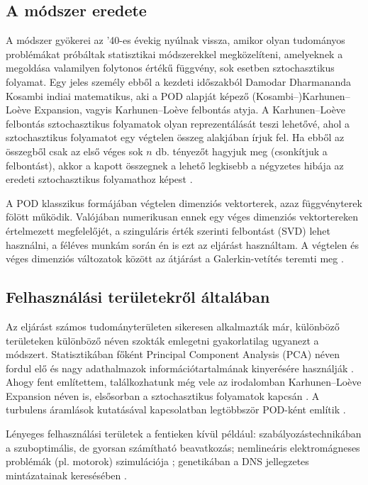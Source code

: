         \subsection{A módszer eredete}
            A módszer gyökerei az '40-es évekig nyúlnak vissza, amikor olyan tudományos problémákat próbáltak statisztikai módszerekkel megközelíteni, amelyeknek a megoldása valamilyen folytonos értékű függvény, sok esetben sztochasztikus folyamat. Egy jeles személy ebből a kezdeti időszakból Damodar Dharmananda Kosambi \cite{Kosambi11} indiai matematikus, aki a POD alapját képező (Kosambi--)Karhunen–Lo\`eve Expansion, vagyis Karhunen–Lo\`eve felbontás atyja. A Karhunen–Lo\`eve felbontás sztochasztikus folyamatok olyan reprezentálását teszi lehetővé, ahol a sztochasztikus folyamatot egy végtelen összeg alakjában írjuk fel. Ha ebből az összegből csak az első véges sok $n$ db. tényezőt hagyjuk meg (csonkítjuk a felbontást), akkor a kapott összegnek a lehető legkisebb a négyzetes hibája az eredeti sztochasztikus folyamathoz képest \cite{Aadithya18}.
            \par
            A POD klasszikus formájában végtelen dimenziós vektorterek, azaz függvényterek fölött működik. Valójában numerikusan ennek egy véges dimenziós vektortereken értelmezett megfelelőjét, a szinguláris érték szerinti felbontást (SVD) lehet használni, a féléves munkám során én is ezt az eljárást használtam. A végtelen és véges dimenziós változatok között az átjárást a Galerkin-vetítés teremti meg \cite{Holmes12}.
        \subsection{Felhasználási területekről általában}
            Az eljárást számos tudományterületen sikeresen alkalmazták már, különböző területeken különböző néven szokták emlegetni gyakorlatilag ugyanezt a módszert. Statisztikában főként Principal Component Analysis (PCA) néven fordul elő és nagy adathalmazok információtartalmának kinyerésére használják \cite{Jolliffe16}. Ahogy fent említettem, találkozhatunk még vele az irodalomban Karhunen–Lo\`eve Expansion néven is, elsősorban a sztochasztikus folyamatok kapcsán \cite{Aadithya18}. A turbulens áramlások kutatásával kapcsolatban legtöbbször POD-ként említik \cite{Sirovich}.
            \par
            Lényeges felhasználási területek a fentieken kívül például: szabályozástechnikában a szuboptimális, de gyorsan számítható beavatkozás; nemlineáris elektromágneses problémák (pl. motorok) szimulációja \cite{Henneron14}; genetikában a DNS jellegzetes mintázatainak keresésében \cite{Chicco15}.
